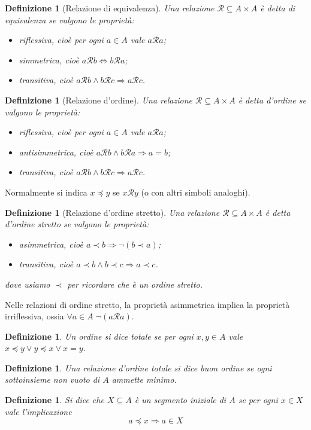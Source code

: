 \documentclass[a4paper,10pt,oneside]{article}
\newcommand{\myname}[1]{\emph{#1}}
\newcommand{\rel}{\mathcal R}
\theoremstyle{plain}
\newtheorem{mydef}[mytheorem]{Definizione}
\theoremstyle{definition}
\theoremstyle{remark}
\begin{document}
\begin{mydef}[Relazione di equivalenza]
 Una relazione $\rel \subseteq A\times A$ è detta di equivalenza se valgono le proprietà:
 \begin{itemize}
  \item riflessiva, cioè per ogni $a\in A$ vale $a\rel a$;
  \item simmetrica, cioè $a \rel b \Leftrightarrow b \rel a$;
  \item transitiva, cioè $a \rel b \land b \rel c \Rightarrow a \rel c$.
 \end{itemize}
\end{mydef}

\begin{mydef}[Relazione d'ordine]
 Una relazione $\rel \subseteq A\times A$ è detta d'ordine se valgono le proprietà:
 \begin{itemize}
  \item riflessiva, cioè per ogni $a\in A$ vale $a\rel a$;
  \item antisimmetrica, cioè $a \rel b \land b \rel a\Rightarrow a = b$;
  \item transitiva, cioè $a \rel b \land b \rel c \Rightarrow a \rel c$.
 \end{itemize}
\end{mydef}

Normalmente si indica $x \preceq y$ se $x \rel y$ (o con altri simboli analoghi).

\begin{mydef}[Relazione d'ordine stretto]
 Una relazione $\rel \subseteq A\times A$ è detta d'ordine stretto se valgono le proprietà:
 \begin{itemize}
  \item asimmetrica, cioè $a \prec b \Rightarrow \lnot (b \prec a)$;
  \item transitiva, cioè $a \prec b \land b \prec c \Rightarrow a \prec c$.
 \end{itemize}
 dove usiamo $\prec$ per ricordare che è un ordine stretto.
\end{mydef}
Nelle relazioni di ordine stretto, la proprietà asimmetrica implica la proprietà irriflessiva, ossia $\forall a \in A \;\lnot (a \rel a)$.

\begin{mydef}
 Un ordine si dice totale se per ogni $x,y \in A$ vale $x \preceq y \lor y \preceq x \lor x=y$.
\end{mydef}
\begin{mydef}
 Una relazione d'ordine totale si dice \myname{buon ordine} se ogni sottoinsieme non vuoto di $A$ ammette minimo.  
\end{mydef}
\begin{mydef}
 Si dice che $X\subseteq A$ è un \myname{segmento iniziale} di $A$ se per ogni $x\in X$ vale l'implicazione \[a\preceq x \Rightarrow a \in X\]
\end{mydef}
\end{document}
